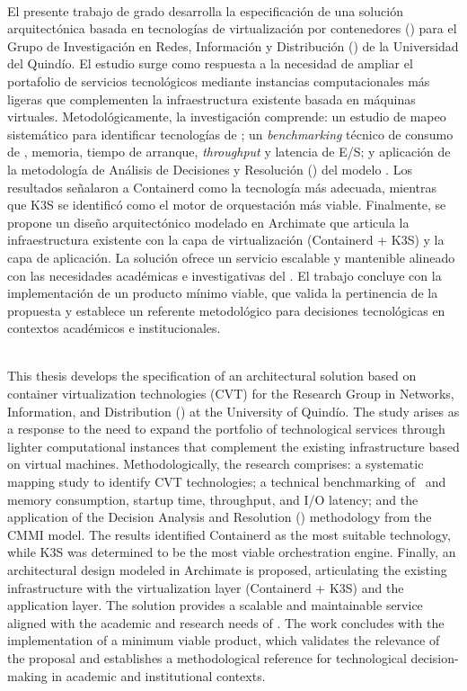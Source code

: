\label{cap:resumen}
\mbox{}\\
El presente trabajo de grado desarrolla la especificación de una solución arquitectónica basada en tecnologías de virtualización por contenedores (\VBC) para el Grupo de Investigación en Redes, Información y Distribución (\GRID) de la Universidad del Quindío. El estudio surge como respuesta a la necesidad de ampliar el portafolio de servicios tecnológicos mediante instancias computacionales más ligeras que complementen la infraestructura existente basada en máquinas virtuales. 
Metodológicamente, la investigación comprende: un estudio de mapeo sistemático para identificar tecnologías de \VBC; un \textit{benchmarking} técnico de consumo de \CPU, memoria, tiempo de arranque, \textit{throughput} y latencia de E/S; y \@la aplicación de la metodología de Análisis de Decisiones y Resolución (\DAR) del modelo \CMMI. Los resultados señalaron a Containerd como la tecnología más adecuada, mientras que K3S se identificó como el motor de orquestación más viable. 
Finalmente, se propone un diseño arquitectónico modelado en Archimate que articula la infraestructura existente con la capa de virtualización (Containerd + K3S) y la capa de aplicación. La solución ofrece un servicio escalable y mantenible alineado con las necesidades académicas e investigativas del \GRID. El trabajo concluye con la implementación de un producto mínimo viable, que valida la pertinencia de la propuesta y establece un referente metodológico para decisiones tecnológicas en contextos académicos e institucionales. 

\label{cap:abstract}
\mbox{}\\
This thesis develops the specification of an architectural solution based on container virtualization technologies (CVT) for the Research Group in Networks, Information, and Distribution (\GRID) at the University of Quindío. The study arises as a response to the need to expand the portfolio of technological services through lighter computational instances that complement the existing infrastructure based on virtual machines. Methodologically, the research comprises: a systematic mapping study to identify CVT technologies; a technical benchmarking of \CPU\ and memory consumption, startup time, throughput, and I/O latency; and the application of the Decision Analysis and Resolution (\DAR) methodology from the CMMI model. The results identified Containerd as the most suitable technology, while K3S was determined to be the most viable orchestration engine. Finally, an architectural design modeled in Archimate is proposed, articulating the existing infrastructure with the virtualization layer (Containerd + K3S) and the application layer. The solution provides a scalable and maintainable service aligned with the academic and research needs of \GRID. The work concludes with the implementation of a minimum viable product, which validates the relevance of the proposal and establishes a methodological reference for technological decision-making in academic and institutional contexts.
